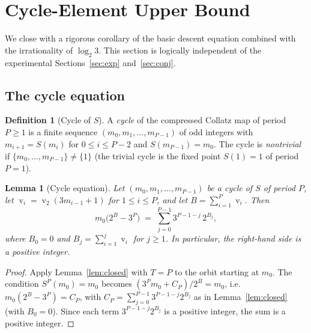 \documentclass[11pt,a4paper]{article}
\newtheorem{lemma}[theorem]{Lemma}
\theoremstyle{definition}
\newtheorem{definition}[theorem]{Definition}
\theoremstyle{remark}
\DeclareMathOperator{\val}{v}
\begin{document}
\section{Cycle-Element Upper Bound}\label{sec:cycle}

We close with a rigorous corollary of the basic descent equation
combined with the irrationality of $\log_2 3$.  This section is
logically independent of the experimental Sections~\ref{sec:exp}
and~\ref{sec:conj}.

\subsection{The cycle equation}

\begin{definition}[Cycle of $S$]\label{def:cycle}
A \emph{cycle} of the compressed Collatz map of period $P \geq 1$ is
a finite sequence $(m_0, m_1, \ldots, m_{P-1})$ of odd integers with
$m_{i+1} = S(m_i)$ for $0 \leq i \leq P - 2$ and $S(m_{P-1}) = m_0$.
The cycle is \emph{nontrivial} if $\{m_0, \ldots, m_{P-1}\} \neq
\{1\}$ (the trivial cycle is the fixed point $S(1) = 1$ of period
$P = 1$).
\end{definition}

\begin{lemma}[Cycle equation]\label{lem:cycleeq}
Let $(m_0, m_1, \ldots, m_{P-1})$ be a cycle of $S$ of period $P$,
let $\val_i = \val_2(3 m_{i-1} + 1)$ for $1 \leq i \leq P$, and let
$B = \sum_{i=1}^{P} \val_i$.  Then
\begin{equation}\label{eq:cycle}
  m_0 \bigl(2^B - 3^P\bigr) \;=\; \sum_{j=0}^{P-1}
    3^{P - 1 - j} \, 2^{B_j},
\end{equation}
where $B_0 = 0$ and $B_j = \sum_{i=1}^{j} \val_i$ for $j \geq 1$.
In particular, the right-hand side is a positive integer.
\end{lemma}

\begin{proof}
Apply Lemma~\ref{lem:closed} with $T = P$ to the orbit starting at
$m_0$.  The condition $S^P(m_0) = m_0$ becomes
$(3^P m_0 + C_P)/2^B = m_0$, i.e.\ $m_0(2^B - 3^P) = C_P$, with
$C_P = \sum_{j=0}^{P-1} 3^{P-1-j} 2^{B_j}$ as in
Lemma~\ref{lem:closed} (with $B_0 = 0$).  Since each term
$3^{P-1-j} 2^{B_j}$ is a positive integer, the sum is a positive
integer.
\end{proof}
\end{document}

